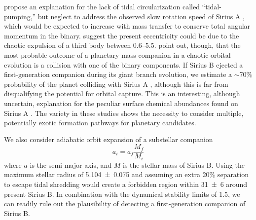 \documentclass[twocolumn]{aastex631}
\begin{document}
\citet{bonacicmarinovicOrbitalEccentricitiesBinary2008} propose an explanation for the lack of tidal circularization called ``tidal-pumping,'' but neglect to address the observed slow rotation speed of Sirius A \citep{grayPreciseRotationRates2014,takedaRotationalVelocitySirius2020a}, which would be expected to increase with mass transfer to conserve total angular momentum in the binary. \citet{peretsTripleEvolutionDynamical2012} suggest the present eccentricity could be due to the chaotic expulsion of a third body between \qtyrange{0.6}{5.5}{\solarmass}. \citet{kratterStarHoppersPlanet2012} point out, though, that the most probable outcome of a planetary-mass companion in a chaotic orbital evolution is a collision with one of the binary components. If Sirius B ejected a first-generation companion during its giant branch evolution, we estimate a $\sim$70\% probability of the planet colliding with Sirius A \citep[Fig. 7]{kratterStarHoppersPlanet2012}, although this is far from disqualifying the potential for orbital capture. This is an interesting, although uncertain, explanation for the peculiar surface chemical abundances found on Sirius A \citep{landstreetAbundancesElementsHe2011a,takedaRotationalVelocitySirius2020a}. The variety in these studies shows the necessity to consider multiple, potentially exotic formation pathways for planetary candidates.

We also consider adiabatic orbit expansion of a substellar companion
\begin{equation}
a_i = a_f \frac{M_{f}}{M_{i}}
\end{equation}
where $a$ is the semi-major axis, and $M$ is the stellar mass of Sirius B. Using the maximum stellar radius of \qty{5.104\pm0.075}{\au} and assuming an extra 20\% separation to escape tidal shredding \citep{nordhausOrbitsLowmassCompanions2013} would create a forbidden region within \qty{31\pm6}{\au} around present Sirius B. In combination with the dynamical stability limits of \qty{1.5}{\au}, we can readily rule out the plausibility of detecting a first-generation companion of Sirius B.
\end{document}
